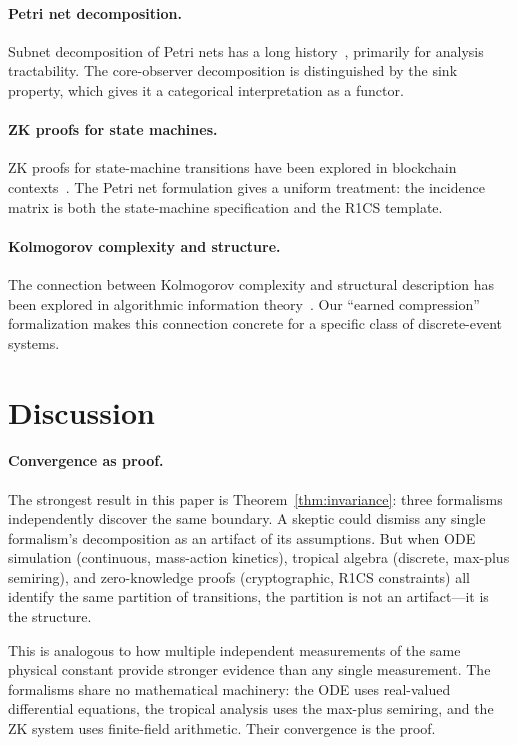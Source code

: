 \documentclass[11pt,a4paper]{article}
\begin{document}
\paragraph{Petri net decomposition.}
Subnet decomposition of Petri nets has a long history~\cite{murata1989}, primarily for analysis tractability.
The core-observer decomposition is distinguished by the sink property, which gives it a categorical interpretation as a functor.

\paragraph{ZK proofs for state machines.}
ZK proofs for state-machine transitions have been explored in blockchain contexts~\cite{ben-sasson2018}.
The Petri net formulation gives a uniform treatment: the incidence matrix is both the state-machine specification and the R1CS template.

\paragraph{Kolmogorov complexity and structure.}
The connection between Kolmogorov complexity and structural description has been explored in algorithmic information theory~\cite{li2008}.
Our ``earned compression'' formalization makes this connection concrete for a specific class of discrete-event systems.

\section{Discussion}
\label{sec:discussion}

\paragraph{Convergence as proof.}
The strongest result in this paper is Theorem~\ref{thm:invariance}: three formalisms independently discover the same boundary.
A skeptic could dismiss any single formalism's decomposition as an artifact of its assumptions.
But when ODE simulation (continuous, mass-action kinetics), tropical algebra (discrete, max-plus semiring), and zero-knowledge proofs (cryptographic, R1CS constraints) all identify the same partition of transitions, the partition is not an artifact---it is the structure.

This is analogous to how multiple independent measurements of the same physical constant provide stronger evidence than any single measurement.
The formalisms share no mathematical machinery: the ODE uses real-valued differential equations, the tropical analysis uses the max-plus semiring, and the ZK system uses finite-field arithmetic.
Their convergence is the proof.
\end{document}
